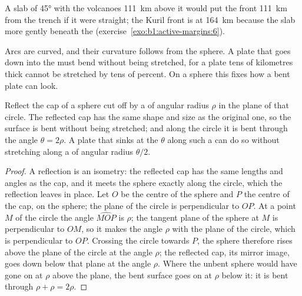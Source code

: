 A slab of \ang{45} with the volcanoes \qty{111}{km} above it would put the
front \qty{111}{km} from the trench if it were straight; the Kuril front is at
\qty{164}{km} because the slab  more gently beneath the 
(exercise~\ref{exo:b1:active-margins:6}).

Arcs are curved, and their curvature follows from the sphere. A plate that
goes down into the  must bend without being stretched, for a plate tens
of kilometres thick cannot be stretched by tens of percent. On a sphere this
fixes how a bent plate can look.

\begin{proposition}\label{prop:b1:active-margins:shell}
Reflect the cap of a sphere cut off by a  of angular radius
$\rho$ in the plane of that circle. The reflected cap has the same shape and
size as the original one, so the surface is bent without being stretched; and
along the circle it is bent through the angle $\theta = 2\rho$. A plate that sinks at the  $\theta$ along such a  can
do so without stretching along a  of angular radius $\theta/2$.
\end{proposition}

\begin{proof}
A reflection is an isometry: the reflected cap has the same lengths and
angles as the cap, and it meets the sphere exactly along the circle, which the
reflection leaves in place. Let $O$ be the centre of the sphere and $P$ the
centre of the cap, on the sphere; the plane of the circle is perpendicular to
$OP$. At a point $M$ of the circle the angle $\widehat{MOP}$ is $\rho$; the
tangent plane of the sphere at $M$ is perpendicular to $OM$, so it makes the
angle $\rho$ with the plane of the circle, which is perpendicular to $OP$.
Crossing the circle towards $P$, the sphere therefore rises above the plane of
the circle at the angle $\rho$; the reflected cap, its mirror image, goes down
below that plane at the angle $\rho$. Where the unbent sphere would have gone
on at $\rho$ above the plane, the bent surface goes on at $\rho$ below it: it is
bent through $\rho + \rho = 2\rho$.
\end{proof}

